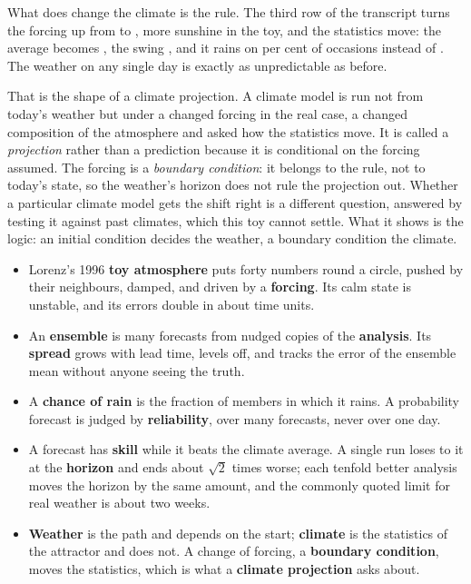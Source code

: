 \noindent
What does change the climate is the rule. The third row of the transcript
turns the forcing up from  to , more sunshine
in the toy, and the statistics move: the average becomes
, the swing , and it rains on
 per cent of occasions instead of .
The weather on any single day is exactly as unpredictable as before.


\noindent
That is the shape of a climate projection. A climate model is run not from
today's weather but under a changed forcing \dash{} in the real case, a
changed composition of the atmosphere \dash{} and asked how the statistics
move. It is called a \emph{projection} rather than a prediction because it
is conditional on the forcing assumed. The forcing is a \emph{boundary
condition}: it belongs to the rule, not to today's state, so the weather's
horizon does not rule the projection out. Whether a particular climate model
gets the shift right is a different question, answered by testing it against
past climates, which this toy cannot settle. What it shows is the logic: an
initial condition decides the weather, a boundary condition the climate.

\begin{summarybox}
\begin{itemize}
\item Lorenz's 1996 \textbf{toy atmosphere} puts forty numbers round a circle,
  pushed by their neighbours, damped, and driven by a \textbf{forcing}. Its
  calm state is unstable, and its errors double in about 
  time units.
\item An \textbf{ensemble} is many forecasts from nudged copies of the
  \textbf{analysis}. Its \textbf{spread} grows with lead time, levels off, and
  tracks the error of the ensemble mean without anyone seeing the truth.
\item A \textbf{chance of rain} is the fraction of members in which it rains.
  A probability forecast is judged by \textbf{reliability}, over many
  forecasts, never over one day.
\item A forecast has \textbf{skill} while it beats the climate average. A
  single run loses to it at the \textbf{horizon} and ends about $\sqrt{2}$
  times worse; each tenfold better analysis moves the horizon by the same
  amount, and the commonly quoted limit for real weather is about two weeks.
\item \textbf{Weather} is the path and depends on the start; \textbf{climate}
  is the statistics of the attractor and does not. A change of forcing, a
  \textbf{boundary condition}, moves the statistics, which is what a
  \textbf{climate projection} asks about.
\end{itemize}
\end{summarybox}

